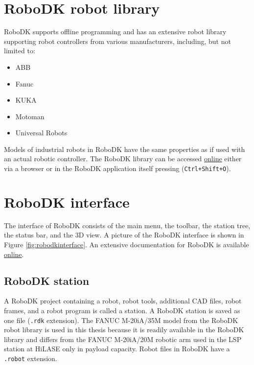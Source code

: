 \section{RoboDK robot library}

RoboDK supports offline programming and has an extensive robot library supporting robot controllers from various manufacturers, including, but not limited to:

\begin{itemize}
    \item ABB 
    \item Fanuc 
    \item KUKA 
    \item Motoman 
    \item Universal Robots 
\end{itemize}
Models of industrial robots in RoboDK have the same properties as if used with an actual robotic controller. The RoboDK library can be accessed \href{https://robodk.com/library}{online} either via a browser or in the RoboDK application itself pressing (\texttt{Ctrl+Shift+O}).


\section{RoboDK interface}

The interface of RoboDK consists of the main menu, the toolbar, the station tree, the status bar, and the 3D view. A picture of the RoboDK interface is shown in Figure \ref{fig:robodkinterface}. An extensive documentation for RoboDK is available \href{https://robodk.com/doc/en/Basic-Guide.html#Start}{online}.

\subsection{RoboDK station}

A RoboDK project containing a robot, robot tools, additional CAD files, robot frames, and a robot program is called a station. A RoboDK station is saved as one file (\texttt{.rdk} extension).  The FANUC M-20iA/35M model from the RoboDK robot library is used in this thesis because it is readily available in the RoboDK library and differs from the FANUC M-20iA/20M robotic arm used in the LSP station at HiLASE only in payload capacity. Robot files in RoboDK have a \texttt{.robot} extension.

